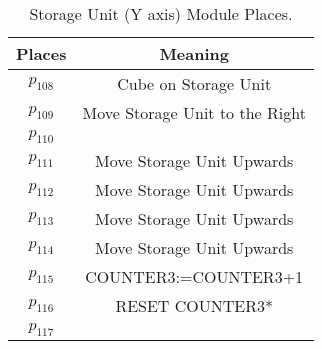 \begin{table}[htbp]
\caption{Storage Unit (Y axis) Module Places.}
\centering
\begin{tabular}{cc}
Places & Meaning\\
\hline
\hyperlink{partialNet:p108}{\hypertarget{partialTable:p108}{$p_{108}$}} & Cube on Storage Unit\\
\hyperlink{partialNet:p109}{\hypertarget{partialTable:p109}{$p_{109}$}} & Move Storage Unit to the Right\\
\hyperlink{partialNet:p110}{\hypertarget{partialTable:p110}{$p_{110}$}} & \\
\hyperlink{partialNet:p111}{\hypertarget{partialTable:p111}{$p_{111}$}} & Move Storage Unit Upwards\\
\hyperlink{partialNet:p112}{\hypertarget{partialTable:p112}{$p_{112}$}} & Move Storage Unit Upwards\\
\hyperlink{partialNet:p113}{\hypertarget{partialTable:p113}{$p_{113}$}} & Move Storage Unit Upwards\\
\hyperlink{partialNet:p114}{\hypertarget{partialTable:p114}{$p_{114}$}} & Move Storage Unit Upwards\\
\hyperlink{partialNet:p115}{\hypertarget{partialTable:p115}{$p_{115}$}} & COUNTER3:=COUNTER3+1\\
\hyperlink{partialNet:p116}{\hypertarget{partialTable:p116}{$p_{116}$}} & RESET COUNTER3*\\
\hyperlink{partialNet:p117}{\hypertarget{partialTable:p117}{$p_{117}$}} & \\
\end{tabular}
\end{table}


